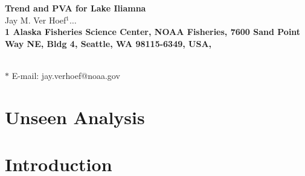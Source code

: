\documentclass[12pt, titlepage]{article}\usepackage{graphicx, color}
\begin{document}

\begin{flushleft}
{\Large
\textbf{Trend and PVA for Lake Iliamna}
}
\\
Jay M. Ver Hoef$^{1} \dots$
\\
\bf{1} Alaska Fisheries Science Center,
NOAA Fisheries, 7600 Sand Point Way NE, Bldg 4, Seattle, WA  98115-6349, USA,

\\
$\ast$ E-mail: jay.verhoef@noaa.gov
\end{flushleft}


\section{Unseen Analysis}



\newpage
\section{Introduction}
\end{document}
